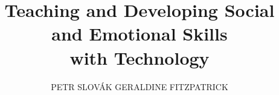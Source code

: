 \documentclass[prodmode,acmtochi]{acmsmall}
\begin{document}



\title{Teaching and Developing Social and Emotional Skills \\ with Technology} 
\author{PETR SLOV\'{A}K %
 GERALDINE FITZPATRICK \\
 ~
	}
        

\maketitle

\end{document}
